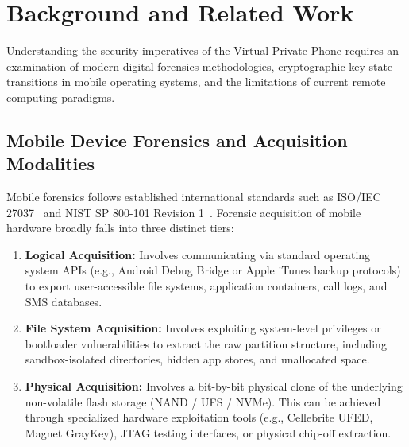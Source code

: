 \section{Background and Related Work}
\label{sec:background}

Understanding the security imperatives of the Virtual Private Phone requires an examination of modern digital forensics methodologies, cryptographic key state transitions in mobile operating systems, and the limitations of current remote computing paradigms.

\subsection{Mobile Device Forensics and Acquisition Modalities}
Mobile forensics follows established international standards such as ISO/IEC 27037~\cite{iso27037} and NIST SP 800-101 Revision 1~\cite{nist800101r1}. Forensic acquisition of mobile hardware broadly falls into three distinct tiers:
\begin{enumerate}
    \item \textbf{Logical Acquisition:} Involves communicating via standard operating system APIs (e.g., Android Debug Bridge or Apple iTunes backup protocols) to export user-accessible file systems, application containers, call logs, and SMS databases.
    \item \textbf{File System Acquisition:} Involves exploiting system-level privileges or bootloader vulnerabilities to extract the raw partition structure, including sandbox-isolated directories, hidden app stores, and unallocated space.
    \item \textbf{Physical Acquisition:} Involves a bit-by-bit physical clone of the underlying non-volatile flash storage (NAND / UFS / NVMe). This can be achieved through specialized hardware exploitation tools (e.g., Cellebrite UFED, Magnet GrayKey), JTAG testing interfaces, or physical chip-off extraction.
\end{enumerate}

